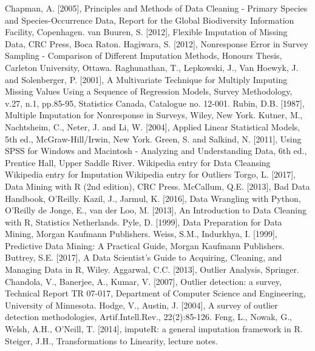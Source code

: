 \begin{thebibliography}{99}
Chapman, A. [2005], Principles and Methods of Data Cleaning - Primary Species and Species-Occurrence Data, Report for the Global Biodiversity Information Facility, Copenhagen.
van Buuren, S. [2012], Flexible Imputation of Missing Data, CRC Press, Boca Raton.
Hagiwara, S. [2012], Nonresponse Error in Survey Sampling - Comparison of Different Imputation Methods, Honours Thesis, Carleton University, Ottawa.
Raghunathan, T., Lepkowski, J., Van Hoewyk, J. and Solenberger, P. [2001], A Multivariate Technique for Multiply Imputing Missing Values Using a Sequence of Regression Models, Survey Methodology, v.27, n.1, pp.85-95, Statistics Canada, Catalogue no. 12-001.
Rubin, D.B. [1987], Multiple Imputation for Nonresponse in Surveys, Wiley, New York.
Kutner, M., Nachtsheim, C., Neter, J. and Li, W. [2004], Applied Linear Statistical Models, 5th ed., McGraw-Hill/Irwin, New York.
Green, S. and Salkind, N. [2011], Using SPSS for Windows and Macintosh - Analyzing and Understanding Data, 6th ed., Prentice Hall, Upper Saddle River.
Wikipedia entry for Data Cleansing 
Wikipedia entry for Imputation
Wikipedia entry for Outliers
Torgo, L. [2017], Data Mining with R (2nd edition), CRC Press.
McCallum, Q.E. [2013], Bad Data Handbook, O'Reilly.
Kazil, J., Jarmul, K. [2016], Data Wrangling with Python, O'Reilly
de Jonge, E., van der Loo, M. [2013], An Introduction to Data Cleaning with R, Statistics Netherlands.
Pyle, D. [1999], Data Preparation for Data Mining, Morgan Kaufmann Publishers.
Weiss, S.M., Indurkhya, I. [1999], Predictive Data Mining: A Practical Guide, Morgan Kaufmann Publishers.
Buttrey, S.E. [2017], A Data Scientist's Guide to Acquiring, Cleaning, and Managing Data in R, Wiley.
Aggarwal, C.C. [2013], Outlier Analysis, Springer.
Chandola, V., Banerjee, A., Kumar, V. [2007], Outlier detection: a survey, Technical Report TR 07-017, Department of Computer Science and Engineering, University of Minnesota.
Hodge, V., Austin, J. [2004], A survey of outlier detection methodologies, Artif.Intell.Rev., 22(2):85-126.
Feng, L., Nowak, G., Welsh, A.H., O'Neill, T. [2014], imputeR: a general imputation framework in R.
Steiger, J.H., Transformations to Linearity, lecture notes.

\end{thebibliography}
